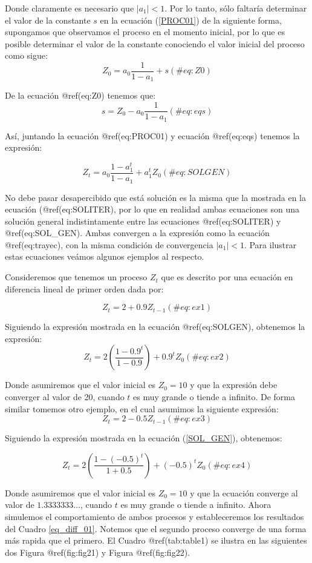 \documentclass[
  a4paper,
]{article}
\begin{document}
Donde claramente es necesario que \(|a_1| < 1\). Por lo tanto, sólo
faltaría determinar el valor de la constante \(s\) en la ecuación
(\ref{PROC01}) de la siguiente forma, supongamos que observamos el
proceso en el momento inicial, por lo que es posible determinar el valor
de la constante conociendo el valor inicial del proceso como sigue: \[
    Z_0 = a_0 \frac{1}{1 - a_1} + s
(\#eq:Z0)
\]

De la ecuación @ref(eq:Z0) tenemos que: \[
    s = Z_0 - a_0 \frac{1}{1 - a_1}
(\#eq:eqs)
\]

Así, juntando la ecuación @ref(eq:PROC01) y ecuación @ref(eq:eqs)
tenemos la expresión:

\[
    Z_t = a_0 \frac{1 - a^t_1}{1 - a_1} + a^t_1 Z_0
(\#eq:SOLGEN)
\]

No debe pasar desapercibido que está solución es la misma que la
mostrada en la ecuación (@ref(eq:SOLITER), por lo que en realidad ambas
ecuaciones son una solución general indistintamente entre las ecuaciones
@ref(eq:SOLITER) y @ref(eq:SOL\_GEN). Ambas convergen a la expresión
como la ecuación @ref(eq:trayec), con la misma condición de convergencia
\(|a_1| < 1\). Para ilustrar estas ecuaciones veámos algunos ejemplos al
respecto.

Consideremos que tenemos un proceso \(Z_t\) que es descrito por una
ecuación en diferencia lineal de primer orden dada por:

\[
    Z_t = 2 + 0.9 Z_{t-1}
(\#eq:ex1)
\]

Siguiendo la expresión mostrada en la ecuación @ref(eq:SOLGEN),
obtenemos la expresión: \[
    Z_t = 2 \left( \frac{1 - 0.9^{t}}{1 - 0.9} \right) + 0.9^t Z_0
(\#eq:ex2)
\]

Donde asumiremos que el valor inicial es \(Z_0 = 10\) y que la expresión
debe converger al valor de 20, cuando \(t\) es muy grande o tiende a
infinito. De forma similar tomemos otro ejemplo, en el cual asumimos la
siguiente expresión: \[
    Z_t = 2 - 0.5 Z_{t-1}
(\#eq:ex3)
\]

Siguiendo la expresión mostrada en la ecuación (\ref{SOL_GEN}),
obtenemos:

\[
    Z_t = 2 \left( \frac{1 - (-0.5)^{t}}{1 + 0.5} \right) + (-0.5)^t Z_0
(\#eq:ex4)
\]

Donde asumiremos que el valor inicial es \(Z_0 = 10\) y que la ecuación
converge al valor de \(1.3333333 \ldots\), cuando \(t\) es muy grande o
tiende a infinito. Ahora simulemos el comportamiento de ambos procesos y
estableceremos los resultados del Cuadro \ref{eq_diff_01}. Notemos que
el segundo proceso converge de una forma más rapida que el primero. El
Cuadro @ref(tab:table1) se ilustra en las siguientes dos Figura
@ref(fig:fig21) y Figura @ref(fig:fig22).
\end{document}
